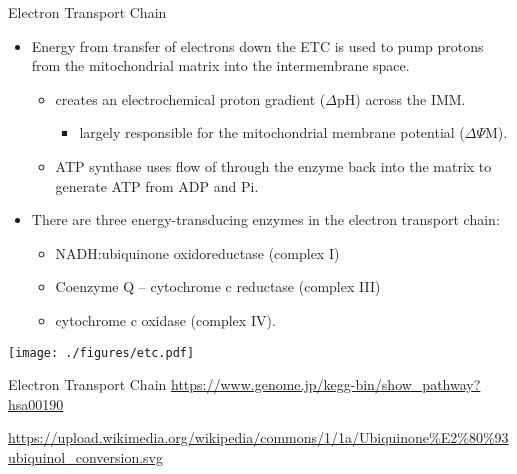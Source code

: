 \documentclass[presentation, smaller]{beamer}
\begin{document}
\begin{frame}[label={sec:org1bcb9b5}]{Electron Transport Chain}
\begin{itemize}
\item Energy from transfer of electrons down the ETC is used to pump
protons from the mitochondrial matrix into the intermembrane space.
\begin{itemize}
\item creates an electrochemical proton gradient (\(\Delta\)pH) across the IMM.
\begin{itemize}
\item largely responsible for the mitochondrial membrane potential (\(\Delta \Psi\)M).
\end{itemize}
\item ATP synthase uses flow of  through the enzyme back into the
matrix to generate ATP from ADP and Pi.
\end{itemize}
\item There are three energy-transducing enzymes in the electron transport
chain:
\begin{itemize}
\item NADH:ubiquinone oxidoreductase (complex I)
\item Coenzyme Q – cytochrome c reductase (complex III)
\item cytochrome c oxidase (complex IV).
\end{itemize}
\end{itemize}

\begin{center}
\texttt{[image: ./figures/etc.pdf]}
\end{center}
\end{frame}

\begin{frame}[label={sec:orgf45cb82}]{Electron Transport Chain}
\url{https://www.genome.jp/kegg-bin/show\_pathway?hsa00190}

\url{https://upload.wikimedia.org/wikipedia/commons/1/1a/Ubiquinone\%E2\%80\%93ubiquinol\_conversion.svg}
\end{frame}
\end{document}
